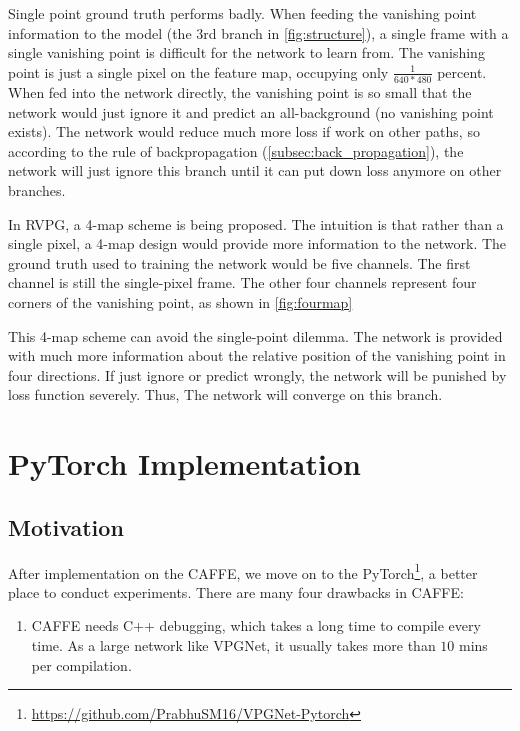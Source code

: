 \begin{spacing}{1.5}
Single point ground truth performs badly. When feeding the vanishing point information to the model (the  $3$rd branch in \autoref{fig:structure}), a single frame with a single vanishing point is difficult for the network to learn from. The vanishing point is just a single pixel on the feature map, occupying only $\frac{1}{640*480}$ percent. When fed into the network directly, the vanishing point is so small that the network would just ignore it and predict an all-background (no vanishing point exists). The network would reduce much more loss if work on other paths, so according to the rule of backpropagation (\autoref{subsec:back_propagation}), the network will just ignore this branch until it can put down loss anymore on other branches.

In RVPG, a 4-map scheme is being proposed. The intuition is that rather than a single pixel, a 4-map design would provide more information to the network. The ground truth used to training the network would be five channels. The first channel is still the single-pixel frame. The other four channels represent four corners of the vanishing point, as shown in \autoref{fig:fourmap}

This 4-map scheme can avoid the single-point dilemma. The network is provided with much more information about the relative position of the vanishing point in four directions. If just ignore or predict wrongly, the network will be punished by loss function severely. Thus, The network will converge on this branch.

\section{PyTorch Implementation}
\label{sec:MD_PyTorch}

\subsection{Motivation}

After implementation on the CAFFE, we move on to the PyTorch\footnote{\url{https://github.com/PrabhuSM16/VPGNet-Pytorch}}, a better place to conduct experiments. There are many four drawbacks in CAFFE: 

\begin{enumerate}

    \item CAFFE needs C++ debugging, which takes a long time to compile every time. As a large network like VPGNet, it usually takes more than $10$ mins per compilation.


\end{enumerate}
\end{spacing}
